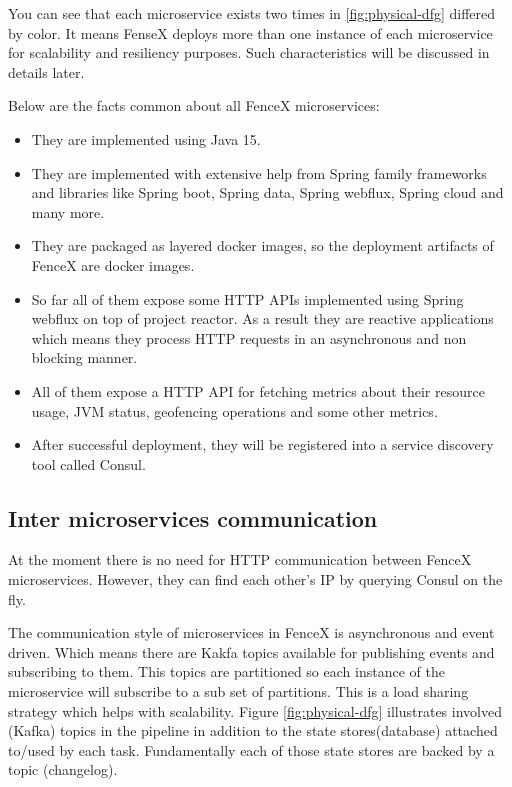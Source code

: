 \documentclass[a4]{report}
\begin{document}
    You can see that each microservice exists two times in \ref{fig:physical-dfg} differed by color.
    It means FenseX deploys more than one instance of each microservice for scalability and resiliency purposes.
    Such characteristics will be discussed in details later.

    Below are the facts common about all FenceX microservices:
    \begin{itemize}
        \item They are implemented using Java 15.
        \item They are implemented with extensive help from Spring family frameworks and libraries like Spring boot, Spring data, Spring webflux, Spring cloud and many more.
        \item They are packaged as layered docker images, so the deployment artifacts of FenceX are docker images.
        \item So far all of them expose some HTTP APIs implemented using Spring webflux on top of project reactor.
        As a result they are reactive applications which means they process HTTP requests in an asynchronous and non blocking manner.
        \item All of them expose a HTTP API for fetching metrics about their resource usage, JVM status, geofencing
        operations and some other metrics.
        \item After successful deployment, they will be registered into a service discovery tool called Consul\cite{Consul}.
    \end{itemize}

    \subsection{Inter microservices communication}
    At the moment there is no need for HTTP communication between FenceX microservices.
    However, they can find each other's IP by querying Consul on the fly.

    The communication style of microservices in FenceX is asynchronous and event driven.
    Which means there are Kakfa topics available for publishing events and subscribing to them.
    This topics are partitioned so each instance of the microservice will subscribe to a sub set of partitions.
    This is a load sharing strategy which helps with scalability.
    Figure \ref{fig:physical-dfg} illustrates involved (Kafka) topics in the pipeline in addition to the state
    stores(database) attached to/used by each task.
    Fundamentally each of those state stores are backed by a topic (changelog).
\end{document}
